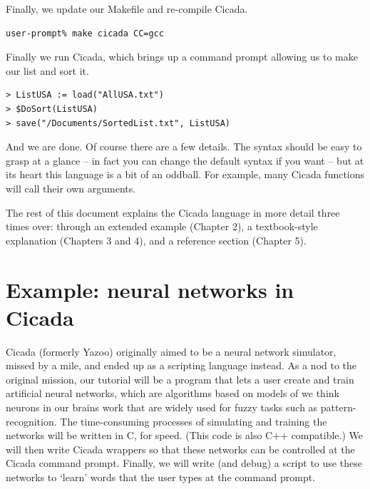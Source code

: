 \documentclass{article}
\newenvironment{code}{
       \begin{list}{}{
               \setlength{\leftmargin}{.4in}
               \setlength{\rightmargin}{0in}
               \setlength{\topsep}{.2in}
       }
       \small
       \item[] }
       { \end{list}   }
\begin{document}
\noindent Finally, we update our Makefile and re-compile Cicada.

\begin{code} \begin{verbatim}
user-prompt% make cicada CC=gcc
\end{verbatim} \end{code}

\noindent Finally we run Cicada, which brings up a command prompt allowing us to make our list and sort it.

\begin{code} \begin{verbatim}
> ListUSA := load("AllUSA.txt")
> $DoSort(ListUSA)
> save("/Documents/SortedList.txt", ListUSA)
\end{verbatim} \end{code}

\noindent And we are done.  Of course there are a few details.  The syntax should be easy to grasp at a glance -- in fact you can change the default syntax if you want -- but at its heart this language is a bit of an oddball.  For example, many Cicada functions will call their own arguments.

The rest of this document explains the Cicada language in more detail three times over:  through an extended example (Chapter 2), a textbook-style explanation (Chapters 3 and 4), and a reference section (Chapter 5).

\newpage








\section{Example:  neural networks in Cicada}

Cicada (formerly Yazoo) originally aimed to be a neural network simulator, missed by a mile, and ended up as a scripting language instead.  As a nod to the original mission, our tutorial will be a program that lets a user create and train artificial neural networks, which are algorithms based on models of we think neurons in our brains work that are widely used for fuzzy tasks such as pattern-recognition.  The time-consuming processes of simulating and training the networks will be written in C, for speed.  (This code is also C++ compatible.)  We will then write Cicada wrappers so that these networks can be controlled at the Cicada command prompt.  Finally, we will write (and debug) a script to use these networks to `learn' words that the user types at the command prompt.
\end{document}
